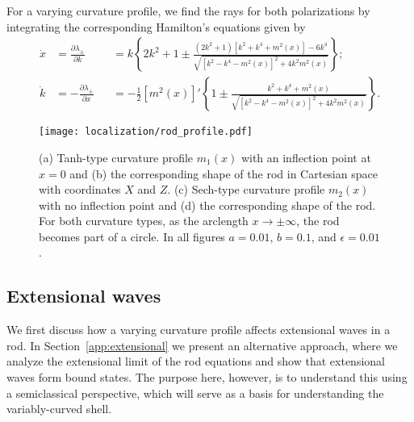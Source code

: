 For a varying curvature profile, we find the rays for both polarizations by integrating the corresponding Hamilton's equations given by
%
\begin{equation}
  \begin{alignedat}{2}
      \dot{x} &= \frac{\partial \lambda_{\pm}}{\partial k} &&= k\left\{2k^{2} + 1 \pm \frac{(2k^{2} + 1)\left[k^{2} + k^{4} + m^{2}(x)\right] - 6k^{4}}{\sqrt{\left[k^{2}-k^{4}-m^{2}(x)\right]^{2} + 4k^{2}m^{2}(x)}}\right\};\\
      \dot{k} &= -\frac{\partial \lambda_{\pm}}{\partial x} &&= -\frac{1}{2}\left[m^{2}(x)\right]'\left\{1 \pm \frac{k^{2} + k^{4} + m^{2}(x)}{\sqrt{\left[k^{2}-k^{4}-m^{2}(x)\right]^{2} + 4k^{2}m^{2}(x)}}\right\}.
  \end{alignedat}
  \label{eq:rod_hamiltonian}
\end{equation}
%
\begin{figure}
  \begin{center}
    \texttt{[image: localization/rod\_profile.pdf]}
  \end{center}
  \caption{%
    (a) Tanh-type curvature profile $m_{1}(x)$ with an inflection point at $x = 0$ and (b) the corresponding shape of the rod in Cartesian space with coordinates $X$ and $Z$.
    (c) Sech-type curvature profile $m_{2}(x)$ with no inflection point and (d) the corresponding shape of the rod.
    For both curvature types, as the arclength $x \to \pm\infty$, the rod becomes part of a circle.
    In all figures $a = 0.01$, $b = 0.1$, and $\epsilon = 0.01$.
  }
  \label{fig:rod_profile}
\end{figure}

\subsection{Extensional waves}
\label{sec:extensional}

We first discuss how a varying curvature profile affects extensional waves in a rod.
In Section~\ref{app:extensional} we present an alternative approach, where we analyze the extensional limit of the rod equations and show that extensional waves form bound states.
The purpose here, however, is to understand this using a semiclassical perspective, which will serve as a basis for understanding the variably-curved shell.

